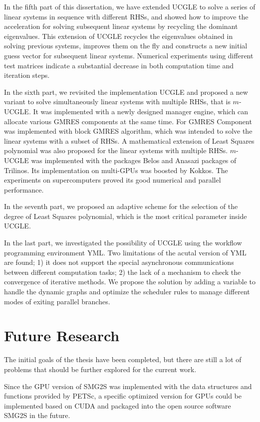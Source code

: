 In the fifth part of this dissertation, we have extended UCGLE to solve a series of linear systems in sequence with different RHSs, and showed how to improve the acceleration for solving subsequent linear systems by recycling the dominant eigenvalues. This extension of UCGLE recycles the eigenvalues obtained in solving previous systems, improves them on the fly and constructs a new initial guess vector for subsequent linear systems. Numerical experiments using different test matrices indicate a substantial decrease in both computation time and iteration steps.

In the sixth part, we revisited the implementation UCGLE and proposed a new variant to solve simultaneously linear systems with multiple RHSs, that is $m$-UCGLE. It was implemented with a newly designed manager engine, which can allocate various GMRES components at the same time. For GMRES Component was implemented with block GMRES algorithm, which was intended to solve the linear systems with a subset of RHSs. A mathematical extension of Least Squares polynomial was also proposed for the linear systems with multiple RHSs. $m$-UCGLE was implemented with the packages Belos and Anasazi packages of Trilinos. Its implementation on multi-GPUs was boosted by Kokkos. The experiments on supercomputers proved its good numerical and parallel performance.

In the seventh part, we proposed an adaptive scheme for the selection of the degree of Least Squares polynomial, which is the most critical parameter inside UCGLE.

In the last part, we investigated the possibility of UCGLE using the workflow programming environment YML. Two limitations of the acutal version of YML are found; 1) it does not support the special asynchronous communications between different computation tasks; 2) the lack of a mechanism to check the convergence of iterative methods. We propose the solution by adding a variable to handle the dynamic graphs and optimize the scheduler rules to manage different modes of exiting parallel branches. 

\section{Future Research}

The initial goals of the thesis have been completed, but there are still a lot of problems that should be further explored for the current work.

Since the GPU version of SMG2S was implemented with the data structures and functions provided by PETSc, a specific optimized version for GPUs could be implemented based on CUDA and packaged into the open source software SMG2S in the future.

